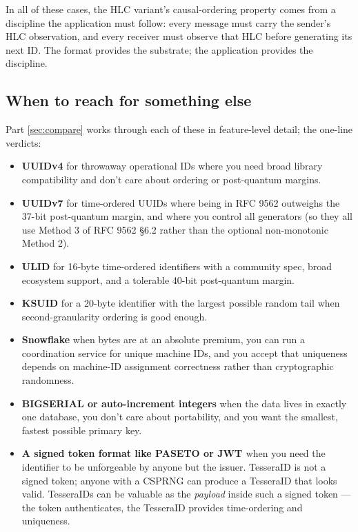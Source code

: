 In all of these cases, the HLC variant's causal-ordering property comes from a discipline the application must follow: every message must carry the sender's HLC observation, and every receiver must observe that HLC before generating its next ID. The format provides the substrate; the application provides the discipline.

\subsection{When to reach for something else}

Part \ref{sec:compare} works through each of these in feature-level detail; the one-line verdicts:

\begin{itemize}
  \item \textbf{UUIDv4} for throwaway operational IDs where you need broad library compatibility and don't care about ordering or post-quantum margins.
  \item \textbf{UUIDv7} for time-ordered UUIDs where being in RFC 9562 outweighs the 37-bit post-quantum margin, and where you control all generators (so they all use Method 3 of RFC 9562 §6.2 rather than the optional non-monotonic Method 2).
  \item \textbf{ULID} for 16-byte time-ordered identifiers with a community spec, broad ecosystem support, and a tolerable 40-bit post-quantum margin.
  \item \textbf{KSUID} for a 20-byte identifier with the largest possible random tail when second-granularity ordering is good enough.
  \item \textbf{Snowflake} when bytes are at an absolute premium, you can run a coordination service for unique machine IDs, and you accept that uniqueness depends on machine-ID assignment correctness rather than cryptographic randomness.
  \item \textbf{BIGSERIAL or auto-increment integers} when the data lives in exactly one database, you don't care about portability, and you want the smallest, fastest possible primary key.
  \item \textbf{A signed token format like PASETO \citep{paseto} or JWT \citep{rfc7519}} when you need the identifier to be unforgeable by anyone but the issuer. TesseraID is not a signed token; anyone with a CSPRNG can produce a TesseraID that looks valid. TesseraIDs can be valuable as the \emph{payload} inside such a signed token --- the token authenticates, the TesseraID provides time-ordering and uniqueness.
\end{itemize}


